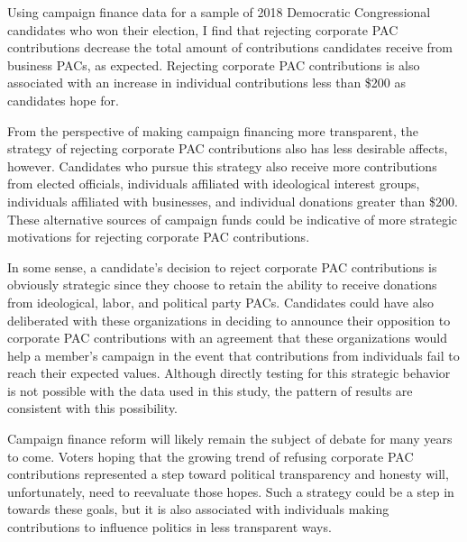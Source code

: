 \documentclass[12pt]{article}
\begin{document}
Using campaign finance data for a sample of 2018 Democratic Congressional candidates who won their election, I find that rejecting corporate PAC contributions decrease the total amount of contributions candidates receive from business PACs, as expected. Rejecting corporate PAC contributions is also associated with an increase in individual contributions less than \$200 as candidates hope for. 

From the perspective of making campaign financing more transparent, the strategy of rejecting corporate PAC contributions also has less desirable affects, however. Candidates who pursue this strategy also receive more contributions from elected officials, individuals affiliated with ideological interest groups, individuals affiliated with businesses, and individual donations greater than \$200. These alternative sources of campaign funds could be indicative of more strategic motivations for rejecting corporate PAC contributions. 

 In some sense, a candidate's decision to reject corporate PAC contributions is obviously strategic since they choose to retain the ability to receive donations from ideological, labor, and political party PACs. Candidates could have also deliberated with these organizations in deciding to announce their opposition to corporate PAC contributions with an agreement that these organizations would help a member's campaign in the event that contributions from individuals fail to reach their expected values. Although directly testing for this strategic behavior is not possible with the data used in this study, the pattern of results are consistent with this possibility.
 
 Campaign finance reform will likely remain the subject of debate for many years to come. Voters hoping that the growing trend of refusing corporate PAC contributions represented a step toward political transparency and honesty will, unfortunately, need to reevaluate those hopes. Such a strategy could be a step in towards these goals, but it is also associated with individuals making contributions to influence politics in less transparent ways. 


\pagebreak
\singlespacing
{}
%
\printbibliography
\pagebreak
\end{document}
